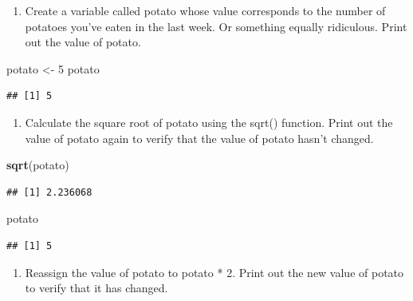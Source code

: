 \documentclass[
]{article}
\newenvironment{Shaded}{\begin{snugshade}}{\end{snugshade}}
\newcommand{\DecValTok}[1]{\textcolor[rgb]{0.00,0.00,0.81}{#1}}
\newcommand{\FunctionTok}[1]{\textcolor[rgb]{0.13,0.29,0.53}{\textbf{#1}}}
\newcommand{\NormalTok}[1]{#1}
\newcommand{\OtherTok}[1]{\textcolor[rgb]{0.56,0.35,0.01}{#1}}
\providecommand{\tightlist}{%
  \setlength{\itemsep}{0pt}\setlength{\parskip}{0pt}}
\begin{document}
\begin{enumerate}
\def\labelenumi{\arabic{enumi}.}
\setcounter{enumi}{2}
\tightlist
\item
  Create a variable called potato whose value corresponds to the number
  of potatoes you've eaten in the last week. Or something equally
  ridiculous. Print out the value of potato.
\end{enumerate}

\begin{Shaded}
\begin{Highlighting}[]
\NormalTok{potato }\OtherTok{\textless{}{-}} \DecValTok{5}
\NormalTok{potato}
\end{Highlighting}
\end{Shaded}

\begin{verbatim}
## [1] 5
\end{verbatim}

\begin{enumerate}
\def\labelenumi{\arabic{enumi}.}
\setcounter{enumi}{3}
\tightlist
\item
  Calculate the square root of potato using the sqrt() function. Print
  out the value of potato again to verify that the value of potato
  hasn't changed.
\end{enumerate}

\begin{Shaded}
\begin{Highlighting}[]
\FunctionTok{sqrt}\NormalTok{(potato)}
\end{Highlighting}
\end{Shaded}

\begin{verbatim}
## [1] 2.236068
\end{verbatim}

\begin{Shaded}
\begin{Highlighting}[]
\NormalTok{potato}
\end{Highlighting}
\end{Shaded}

\begin{verbatim}
## [1] 5
\end{verbatim}

\begin{enumerate}
\def\labelenumi{\arabic{enumi}.}
\setcounter{enumi}{4}
\tightlist
\item
  Reassign the value of potato to potato * 2. Print out the new value of
  potato to verify that it has changed.
\end{enumerate}
\end{document}
